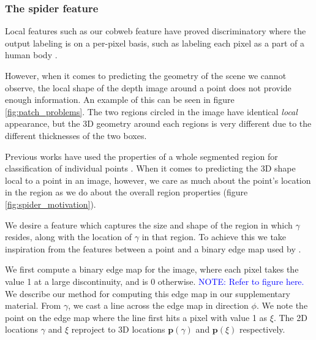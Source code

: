 \documentclass[10pt,twocolumn,letterpaper]{article}
\newcommand{\pixelidx}{\gamma}
\newcommand{\edgeimidx}{\xi}
\newcommand{\project}{\mathbf{p}}
\newcommand{\point}{\mathbf{p}}
\newcommand{\note}[1]{\textcolor{blue}{NOTE: #1}}
\begin{document}
\subsubsection{The spider feature}

Local features such as our cobweb feature have proved discriminatory where the output labeling is on a per-pixel basis, such as labeling each pixel as a part of a human body \cite{shotton-cvpr-2011}.

However, when it comes to predicting the geometry of the scene we cannot observe, the local shape of the depth image around a point does not provide enough information. 
An example of this can be seen in figure \ref{fig:patch_problems}.
The two regions circled in the image have identical \emph{local} appearance, but the 3D geometry around each regions is very different due to the different thicknesses of the two boxes.

Previous works have used the properties of a whole segmented region for classification of individual points \cite{golovinskiy-iccv-2009}.
When it comes to predicting the 3D shape local to a point in an image, however, we care as much about the point's location in the region as we do about the overall region properties (figure \ref{fig:spider_motivation}).

We desire a feature which captures the size and shape of the region in which $\pixelidx$ resides, along with the location of $\pixelidx$ in that region.
To achieve this we take inspiration from the features between a point and a binary edge map used by \cite{drost-3dimpvt-2012}.

We first compute a binary edge map for the image, where each pixel takes the value 1 at a large discontinuity, and is 0 otherwise. \note{Refer to figure here.}
We describe our method for computing this edge map in our supplementary material.
From $\pixelidx$, we cast a line across the edge map in direction $\phi$.
We note the point on the edge map where the line first hits a pixel with value 1 as $\edgeimidx$.
The 2D locations $\pixelidx$ and $\edgeimidx$ reproject to 3D locations $\project(\pixelidx)$ and $\project(\edgeimidx)$ respectively.
\end{document}
